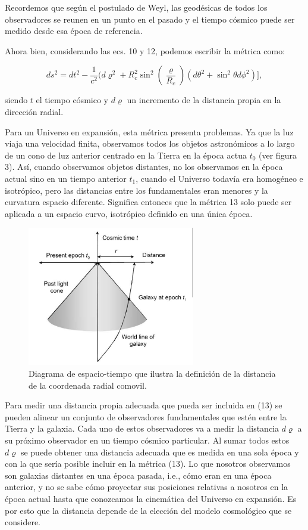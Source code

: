 \documentclass[11pt]{article}
\begin{document}
Recordemos que según el postulado de Weyl, las geodésicas de todos los observadores se reunen en un punto en el pasado y el tiempo cósmico puede ser medido desde esa época de referencia. 

Ahora bien, considerando las ecs. 10 y 12, podemos escribir la métrica como:

    \begin{equation}
        ds^2 = dt^2 - \frac{1}{c^2}( d\varrho^2 + R_c^2 \sin^2\left(\frac{\varrho}{R_c} \right) (d\theta^2 +  \sin^2 \theta d\phi^2)],
    \end{equation}

siendo $t$ el tiempo cósmico y $d\varrho$ un incremento de la distancia propia en la dirección radial. 

Para un Universo en expansión, esta métrica presenta problemas. Ya que la luz viaja una velocidad finita, observamos todos los objetos astronómicos a lo largo de un cono de luz anterior centrado en la Tierra en la época actua $t_0$ (ver figura 3). Así, cuando observamos objetos distantes, no los observamos en la época actual sino en un tiempo anterior $t_1$, cuando el Universo todavía era homogéneo e isotrópico, pero las distancias entre los fundamentales eran menores y la curvatura espacio diferente. Significa entonces que la métrica 13 solo puede ser aplicada a un espacio curvo, isotrópico definido en una única época. 

\begin{figure}               \includegraphics[width=0.65\textwidth]{cono_luz_pp159.png}
        \caption{\footnotesize{Diagrama de espacio-tiempo que ilustra la definición de la distancia de la coordenada radial comovil.}}
    \end{figure}
    
    
Para medir una distancia propia adecuada que pueda ser incluida en (13)  se pueden alinear un conjunto de observadores fundamentales que estén entre la Tierra y la galaxia. Cada uno de estos observadores va a medir la distancia $d \varrho$ a su próximo observador en un tiempo cósmico particular. Al sumar todos estos $d \varrho$ se puede obtener una distancia adecuada que es medida en una sola época y con la que sería posible incluir en la métrica (13). Lo que nosotros observamos son galaxias distantes en una época pasada, i.e., cómo eran en una época anterior, y no se sabe cómo proyectar sus posiciones relativas a nosotros en la época actual hasta que conozcamos la cinemática del Universo en expansión. Es por esto que la distancia depende de la elección del modelo cosmológico que se considere. 
\end{document}
